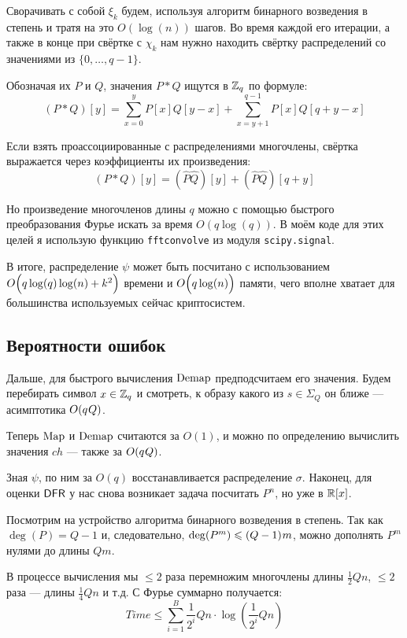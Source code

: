 Сворачивать с собой $\xi_k$ будем, используя алгоритм бинарного возведения в степень и тратя на это $O(\log(n))$ шагов. Во время каждой его итерации, а также в конце при свёртке с $\chi_k$ нам нужно находить свёртку распределений со значениями из $\{0, \ldots, q-1\}$.

Обозначая их $P$ и $Q$, значения $P * Q$ ищутся в $\mathbb{Z}_q$ по формуле:
\begin{equation}
	(P*Q)[y] = \sum_{x=0}^y{P[x]Q[y-x]}+\sum_{x=y+1}^{q-1}{P[x]Q[q+y-x]}
\end{equation}

Если взять проассоциированные с распределениями многочлены, свёртка выражается через коэффициенты их произведения:
\begin{equation}
	(P*Q)[y] = (\hat P\hat Q)[y]+(\hat P\hat Q)[q+y]
\end{equation}

Но произведение многочленов длины $q$ можно с помощью быстрого преобразования Фурье искать за время $O(q\log(q))$. В моём коде для этих целей я использую функцию \texttt{fftconvolve} из модуля \texttt{scipy.signal}.

В итоге, распределение $\psi$ может быть посчитано с использованием $O\Bigl(q\log(q)\log(n)+k^2\Bigr)$ времени и $O\Bigl(q\log(n)\Bigr)$ памяти, чего вполне хватает для большинства используемых сейчас криптосистем.

\subsection{Вероятности ошибок}

Дальше, для быстрого вычисления $\operatorname{Demap}$ предподсчитаем его значения. Будем перебирать символ $x \in \mathbb{Z}_q$ и смотреть, к образу какого из $s \in \Sigma_Q$ он ближе --- асимптотика $O(q\:\!Q)$.

Теперь $\operatorname{Map}$ и $\operatorname{Demap}$ считаются за $O(1)$, и можно по определению вычислить значения $ch$ --- также за $O(q\:\!Q)$.

Зная $\psi$, по ним за $O(q)$ восстанавливается распределение $\sigma$. Наконец, для оценки $\mathsf{DFR}$ у нас снова возникает задача посчитать $P^n$, но уже в $\mathbb{R}[x]$.

Посмотрим на устройство алгоритма бинарного возведения в степень. Так как $\deg(P) = Q-1$ и, следовательно, $\deg(P^m) \leqslant (Q-1)\:\!m$, можно дополнять $P^m$ нулями до длины $Qm$.

В процессе вычисления мы $\leq 2$ раза перемножим многочлены длины $\frac12 Qn$, $\leq 2$ раза --- длины $\frac14 Qn$ и т.д. С Фурье суммарно получается:
\begin{equation}
	Time \leq \sum_{i=1}^B{\frac1{2^i}Qn\cdot\log\left(\frac1{2^i}Qn\right)}
\end{equation}

